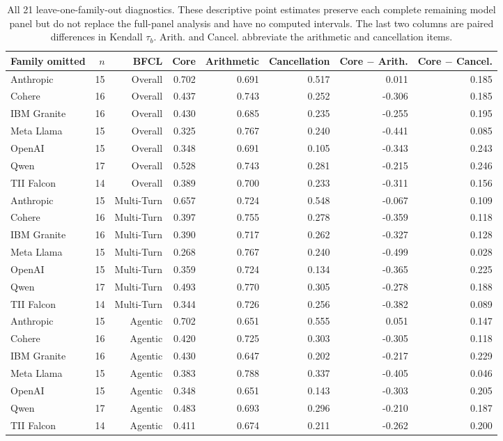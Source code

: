 \begin{table}[t]
\centering
\footnotesize
\setlength{\tabcolsep}{3pt}
\begin{tabular}{lrrrrrrr}
\toprule
Family omitted & $n$ & BFCL & Core & Arithmetic & Cancellation & Core $-$ Arith. & Core $-$ Cancel. \\
\midrule
Anthropic & 15 & Overall & 0.702 & 0.691 & 0.517 & 0.011 & 0.185 \\
Cohere & 16 & Overall & 0.437 & 0.743 & 0.252 & -0.306 & 0.185 \\
IBM Granite & 16 & Overall & 0.430 & 0.685 & 0.235 & -0.255 & 0.195 \\
Meta Llama & 15 & Overall & 0.325 & 0.767 & 0.240 & -0.441 & 0.085 \\
OpenAI & 15 & Overall & 0.348 & 0.691 & 0.105 & -0.343 & 0.243 \\
Qwen & 17 & Overall & 0.528 & 0.743 & 0.281 & -0.215 & 0.246 \\
TII Falcon & 14 & Overall & 0.389 & 0.700 & 0.233 & -0.311 & 0.156 \\
Anthropic & 15 & Multi-Turn & 0.657 & 0.724 & 0.548 & -0.067 & 0.109 \\
Cohere & 16 & Multi-Turn & 0.397 & 0.755 & 0.278 & -0.359 & 0.118 \\
IBM Granite & 16 & Multi-Turn & 0.390 & 0.717 & 0.262 & -0.327 & 0.128 \\
Meta Llama & 15 & Multi-Turn & 0.268 & 0.767 & 0.240 & -0.499 & 0.028 \\
OpenAI & 15 & Multi-Turn & 0.359 & 0.724 & 0.134 & -0.365 & 0.225 \\
Qwen & 17 & Multi-Turn & 0.493 & 0.770 & 0.305 & -0.278 & 0.188 \\
TII Falcon & 14 & Multi-Turn & 0.344 & 0.726 & 0.256 & -0.382 & 0.089 \\
Anthropic & 15 & Agentic & 0.702 & 0.651 & 0.555 & 0.051 & 0.147 \\
Cohere & 16 & Agentic & 0.420 & 0.725 & 0.303 & -0.305 & 0.118 \\
IBM Granite & 16 & Agentic & 0.430 & 0.647 & 0.202 & -0.217 & 0.229 \\
Meta Llama & 15 & Agentic & 0.383 & 0.788 & 0.337 & -0.405 & 0.046 \\
OpenAI & 15 & Agentic & 0.348 & 0.651 & 0.143 & -0.303 & 0.205 \\
Qwen & 17 & Agentic & 0.483 & 0.693 & 0.296 & -0.210 & 0.187 \\
TII Falcon & 14 & Agentic & 0.411 & 0.674 & 0.211 & -0.262 & 0.200 \\
\bottomrule
\end{tabular}
\caption{All 21 leave-one-family-out diagnostics. These descriptive point estimates preserve each complete remaining model panel but do not replace the full-panel analysis and have no computed intervals. The last two columns are paired differences in Kendall $\tau_b$. Arith. and Cancel. abbreviate the arithmetic and cancellation items.}
\label{tab:family-diagnostics}
\end{table}
